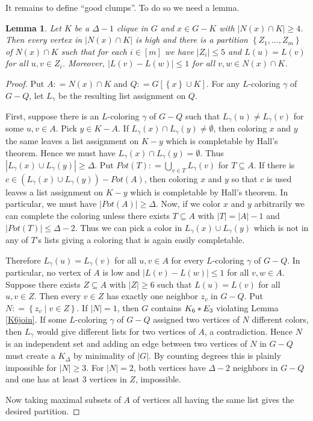 \documentclass[12pt]{amsart}
\theoremstyle{plain}
\newtheorem{lem}[thm]{Lemma}
\theoremstyle{definition}
\theoremstyle{remark}
\newcommand{\set}[1]{\left\{ #1 \right\}}
\newcommand{\setbs}[2]{\left\{ #1 \mid #2 \right\}}
\newcommand{\card}[1]{\left|#1\right|}
\newcommand{\irange}[1]{\left[#1\right]}
\newcommand{\join}[2]{#1 \mbox{\hspace{2 pt}$\ast$\hspace{2 pt}} #2}
\newcommand{\DefinedAs}{\mathrel{\mathop:}=}
\begin{document}
It remains to define ``good clumps''.  To do so we need a lemma.

\begin{lem}\label{clumping}
Let $K$ be a $\Delta-1$ clique in $G$ and $x \in G - K$ with $\card{N(x) \cap
K} \geq 4$.  Then every vertex in $\card{N(x) \cap
K}$ is high and there is a partition $\set{Z_1, \ldots, Z_m}$
of $N(x) \cap K$ such that for each $i \in \irange{m}$ we have $\card{Z_i} \leq
5$ and $L(u) = L(v)$ for all $u, v \in Z_i$.  Moreover, $\card{L(v) - L(w)}
\leq 1$ for all $v, w \in N(x) \cap K$.
\end{lem}
\begin{proof}
Put $A \DefinedAs N(x) \cap K$ and $Q \DefinedAs G[\set{x} \cup K]$.  For any
$L$-coloring $\gamma$ of $G - Q$, let $L_\gamma$ be the resulting list
assignment on $Q$.

First, suppose there is an $L$-coloring $\gamma$ of $G - Q$ such that
$L_\gamma(u) \neq L_\gamma(v)$ for some $u, v \in A$.  Pick $y \in K - A$.  If
$L_\gamma(x) \cap L_\gamma(y) \neq \emptyset$, then coloring $x$ and $y$ the
same leaves a list assignment on $K - y$  which is completable by Hall's theorem.
Hence we must have $L_\gamma(x) \cap L_\gamma(y) = \emptyset$.  Thus $\card{L_\gamma(x) \cup L_\gamma(y)} \geq \Delta$.  Put $Pot(T) \DefinedAs \bigcup_{v \in T} L_\gamma(v)$ for $T \subseteq A$.  If there is $c \in (L_\gamma(x) \cup L_\gamma(y)) - Pot(A)$, then coloring $x$ and $y$ so that $c$ is used leaves a list assignment on $K-y$ which is completable by Hall's theorem.  In particular, we must have $\card{Pot(A)} \geq \Delta$. Now, if we color $x$ and $y$ arbitrarily we can complete the coloring unless there exists $T \subseteq A$ with $\card{T} = \card{A}-1$ and $\card{Pot(T)} \leq \Delta - 2$.  Thus we can pick a color in $L_\gamma(x) \cup L_\gamma(y)$ which is not in any of $T$'s lists giving a coloring that is again easily completable.

Therefore $L_\gamma(u) = L_\gamma(v)$ for all $u, v \in A$ for every
$L$-coloring $\gamma$ of $G - Q$.  In particular, no vertex of $A$ is
low and $\card{L(v) - L(w)} \leq 1$ for all $v, w \in A$.  Suppose there exists
$Z \subseteq A$ with $\card{Z} \geq 6$ such that $L(u) = L(v)$ for all $u, v \in Z$.  Then every $v
\in Z$ has exactly one neighbor $z_v$ in $G-Q$.  Put $N \DefinedAs
\setbs{z_v}{v \in Z}$.  If $\card{N} = 1$, then $G$ contains $\join{K_6}{E_3}$
violating Lemma \ref{K6join}.  If some $L$-coloring $\gamma$ of $G-Q$ assigned
two vertices of $N$ different colors, then $L_\gamma$ would give different lists
for two vertices of $A$, a contradiction.  Hence $N$ is an independent set and
adding an edge between two vertices of $N$ in $G-Q$ must create a $K_\Delta$ by
minimality of $\card{G}$.  By counting degrees this is plainly impossible for
$\card{N} \geq 3$.  For $\card{N} = 2$, both vertices have $\Delta-2$ neighbors
in $G-Q$ and one has at least $3$ vertices in $Z$, impossible.

Now taking maximal subsets of $A$ of vertices all having the same list gives the
desired partition.
\end{proof}
\end{document}
